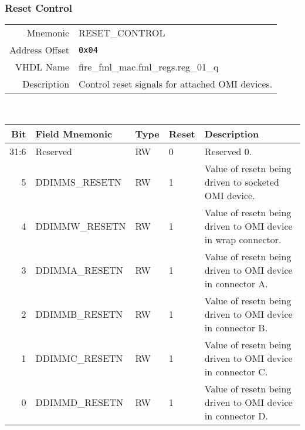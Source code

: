 \subsubsection{Reset Control}
\begin{tabular}{ r | p{350px} }
  Mnemonic       & RESET\_CONTROL                      \\
  Address Offset & \texttt{0x04}                       \\
  VHDL Name      & fire\_fml\_mac.fml\_regs.reg\_01\_q \\ \hline

  Description &
  Control reset signals for attached OMI devices. \\
\end{tabular}
\\
\begin{tabularx}{\textwidth}{r|l|l|l|X}
  \hline
  Bit   & Field Mnemonic          & Type & Reset & Description \\ \hline

  31:6  & Reserved                & RW   & 0     &

  Reserved 0. \\

  5     & DDIMMS\_RESETN          & RW   & 1     &

  Value of resetn being driven to socketed OMI device. \\

  4     & DDIMMW\_RESETN          & RW   & 1     &

  Value of resetn being driven to OMI device in wrap connector. \\

  3     & DDIMMA\_RESETN          & RW   & 1     &

  Value of resetn being driven to OMI device in connector A. \\

  2     & DDIMMB\_RESETN          & RW   & 1     &

  Value of resetn being driven to OMI device in connector B. \\

  1     & DDIMMC\_RESETN          & RW   & 1     &

  Value of resetn being driven to OMI device in connector C. \\

  0     & DDIMMD\_RESETN          & RW   & 1     &

  Value of resetn being driven to OMI device in connector D. \\
\end{tabularx}

